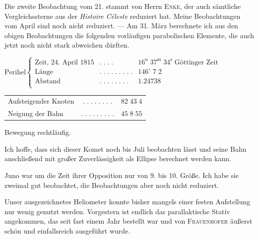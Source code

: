 \par\indent Die zweite Beobachtung vom 21. stammt von Herrn \textsc{Enke}, der auch sämtliche Vergleichssterne aus der \emph{Histoire Céleste} reduziert hat. Meine Beobachtungen vom April sind noch nicht reduziert. --- Am 31. März berechnete ich aus den obigen Beobachtungen die folgenden vorläufigen parabolischen Elemente, die auch jetzt noch nicht stark abweichen dürften.

\begin{center}\fontsize{9}{11}\selectfont $\text{Perihel}\left\{\begin{array}{lcr}
\text{Zeit, 24. April 1815} & .\;.\;.\;. & 16^{\mathrm u}\;37^{\mathrm m}\;34^{\mathrm s}\;\text{Göttinger Zeit}\\
\text{Länge} & .\;.\;.\;.\;.\;.\;.\;.\;. & 146^\circ\;7\;2\\
\text{Abstand} & .\;.\;.\;.\;.\;.\;.\;. & 1.24738\\
\end{array}\right.$\end{center}
\begin{center}\fontsize{10}{12}\selectfont\setlength{\tabcolsep}{3pt}\renewcommand{\arraystretch}{1.15}\begin{tabular}{lcr}
Aufsteigender Knoten & $.\;.\;.\;.\;.\;.\;.\;.$ & $82\;43\;4$\\
Neigung der Bahn & $.\;.\;.\;.\;.\;.\;.\;.\;.$ & $45\;8\;55$\\
\end{tabular}\end{center}
\noindent Bewegung rechtläufig.

\par\indent Ich hoffe, dass sich dieser Komet noch bis Juli beobachten lässt und seine Bahn anschließend mit großer Zuverlässigkeit als Ellipse berechnet werden kann.

\par\indent Juno war um die Zeit ihrer Opposition nur von 9. bis 10. Größe. Ich habe sie zweimal gut beobachtet, die Beobachtungen aber noch nicht reduziert.

\par\indent Unser ausgezeichnetes Heliometer konnte bisher mangels einer festen Aufstellung nur wenig genutzt werden. Vorgestern ist endlich das parallaktische Stativ angekommen, das seit fast einem Jahr bestellt war und von \textsc{Frauenhofer} äußerst schön und einfallsreich ausgeführt wurde.
